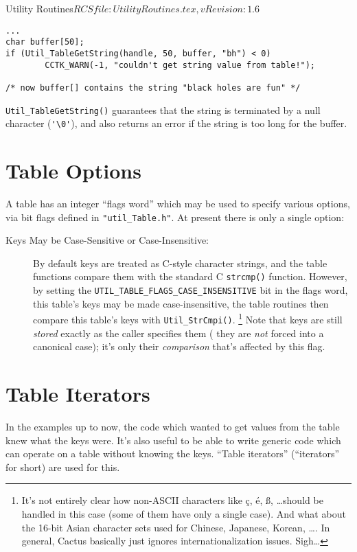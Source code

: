 \begin{cactuspart}{3}{Utility Routines}{$RCSfile: UtilityRoutines.tex,v $}{$Revision: 1.6 $}
\begin{verbatim}
...
char buffer[50];
if (Util_TableGetString(handle, 50, buffer, "bh") < 0)
        CCTK_WARN(-1, "couldn't get string value from table!");

/* now buffer[] contains the string "black holes are fun" */
\end{verbatim}

\verb|Util_TableGetString()| guarantees that the string is
terminated by a null character (\verb|'\0'|), and also returns an
error if the string is too long for the buffer.


\section{Table Options}

A table has an integer ``flags word'' which may be used to specify
various options, via bit flags defined in \verb|"util_Table.h"|.
At present there is only a single option:
\begin{description}
\item[Keys May be Case-Sensitive or Case-Insensitive:]
	By default keys are treated as C-style character strings,
	and the table functions compare them with the standard C
	\verb|strcmp()| function.
	However, by setting the \verb|UTIL_TABLE_FLAGS_CASE_INSENSITIVE|
	bit in the flags word, this table's keys may be made
	case-insensitive, \ie{} the table routines then compare
	this table's keys with \verb|Util_StrCmpi()|.%
\footnote{%
 	 It's not entirely clear how non-ASCII characters
	 like \c{c}, \'{e}, \ss, \dots should be handled in
	 this case (some of them have only a single case).
	 And what about the 16-bit Asian character sets
	 used for Chinese, Japanese, Korean, \dots.
	 In general, Cactus basically just ignores
	 internationalization issues.  Sigh\dots
	 }%
{}
	Note that keys are still {\em stored\/} exactly as
	the caller specifies them (\ie{} they are {\em not\/}
	forced into a canonical case); it's only their
	{\em comparison\/} that's affected by this flag.
\end{description}


\section{Table Iterators}

In the examples up to now, the code which wanted to get values from
the table knew what the keys were.  It's also useful to be able to
write generic code which can operate on a table without knowing the
keys.  ``Table iterators'' (``iterators'' for short) are used for this.


\end{cactuspart}
